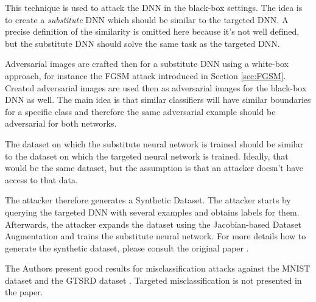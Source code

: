 This technique is used to attack the DNN in the black-box settings. The idea is to create a \textit{substitute} DNN which should be similar to the targeted DNN. A precise definition of the similarity is omitted here because it's not well defined, but the substitute DNN should solve the same task as the targeted DNN.

Adversarial images are crafted then for a substitute DNN using a white-box approach, for instance the FGSM attack introduced in Section \ref{sec:FGSM}. Created adversarial images are used then as adversarial images for the black-box DNN as well. The main idea is that similar classifiers will have similar boundaries for a specific class and therefore the same adversarial example should be adversarial for both networks. 

The dataset on which the substitute neural network is trained should be similar to the dataset on which the targeted neural network is trained. Ideally, that would be the same dataset, but the assumption is that an attacker doesn't have access to that data. 

The attacker therefore generates a Synthetic Dataset. The attacker starts by querying the targeted DNN with several examples and obtains labels for them. Afterwards, the attacker expands the dataset using the Jacobian-based Dataset Augmentation and trains the substitute neural network. For more details how to generate the synthetic dataset, please consult the original paper  \cite{DBLP:journals/corr/PapernotMGJCS16}.

The Authors present good results for misclassification attacks against the MNIST dataset and the GTSRD dataset \cite{datasetGTSRD}. Targeted misclassification is not presented in the paper.